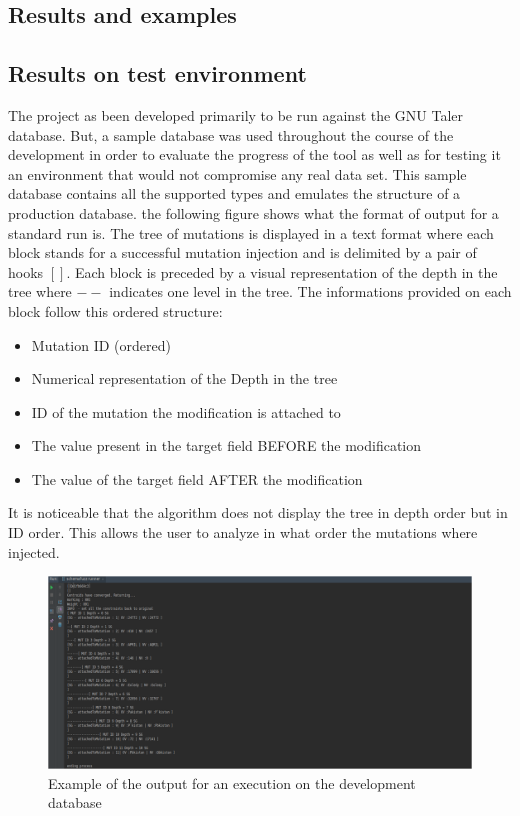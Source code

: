 \documentclass{article}
\begin{document}
\begin{empfile}
			\clearpage

	\section{Results and examples}
		\subsection{Results on test environment}
The project as been developed primarily to be run against the GNU Taler database. But, a sample database was used throughout the course of the development in order to evaluate the progress of the tool as well as for testing it an environment that would not compromise any real data set.
This sample database contains all the supported types and emulates the structure of a production database.
the following figure shows what the format of output for a standard run is. The tree of mutations is displayed in a text format where each block stands for a successful mutation injection and is delimited by a pair of hooks $[]$. Each block is preceded by a visual representation of the depth in the tree where $--$ indicates one level in the tree. 
The informations provided on each block follow this ordered structure:
		\begin{itemize}
		\item{Mutation ID (ordered)}
		\item{Numerical representation of the Depth in the tree}
		\item{ID of the mutation the modification is attached to}
		\item{The value present in the target field BEFORE the modification}
		\item{The value of the target field AFTER the modification}
		\end{itemize}
				

It is noticeable that the algorithm does not display the tree in depth order but in ID order.
This allows the user to analyze in what order the mutations where injected.

		\bigskip
		\begin{figure} [h!]
			\includegraphics[width=\textwidth]{sc2.png}
			\caption{Example of the output for an execution on the development database}
		\end{figure}
		\bigskip
		

\end{empfile}
\end{document}
